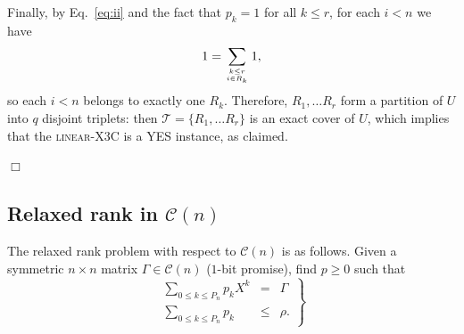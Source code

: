 \documentclass[envcountsect,envcountsame]{svjour3}
\theoremstyle{changebreak}                %
\newenvironment{proof}
 {{\sl Proof.}\hspace*{1 ex}}%
 {{\nopagebreak\hspace*{\fill}$\Box$\par\vspace{12pt}}}
\newcommand{\CONX}[1]{\mathcal{C}(#1)}
\begin{document}
\begin{proof}
Finally, by Eq.~\eqref{eq:ii} and the fact that $p_k=1$ for all $k\le r$, for each $i<n$ we have \[1=\sum_{k\le r\atop i\in R_k}1,\] so each $i<n$ belongs to exactly one $R_k$. Therefore, $R_1,\ldots R_r$ form a partition of $U$ into $q$ disjoint triplets: then $\mathcal{T}=\{R_1,\ldots R_r\}$ is an exact cover of $U$, which implies that the \textsc{linear}-X3C is a YES instance, as claimed.
\end{proof}

\subsection{Relaxed rank in $\CONX{n}$}
\label{s:rrank}
The relaxed rank problem with respect to $\CONX{n}$ is as follows. Given a symmetric $n\times n$ matrix $\Gamma\in\CONX{n}$ ($1$-bit promise), find $p\ge 0$ such that
\begin{equation}
  \left.\begin{array}{rcl}
  \sum\limits_{0\le k\le P_n} p_k X^k &=& \Gamma \\
  \sum\limits_{0\le k\le P_n} p_k &\le & \rho.
    \end{array}\right\} \label{eq:rrconx}
\end{equation}
\end{document}
